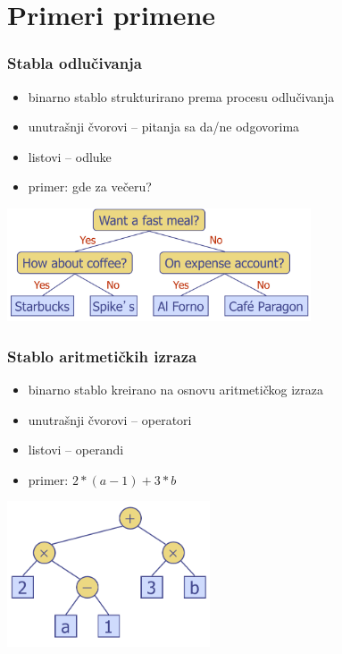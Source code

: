 \documentclass[compress,aspectratio=169]{beamer}
\begin{document}
\section[Primeri]{Primeri primene}
\begin{frame}[fragile]
  \frametitle{Stabla odlučivanja}
  \begin{itemize}
    \item binarno stablo strukturirano prema procesu odlučivanja
    \item unutrašnji čvorovi -- pitanja sa da/ne odgovorima
    \item listovi -- odluke
    \item primer: gde za večeru?
  \end{itemize}
  \begin{center}
    \includegraphics[width=9cm]{asp-08-pic16.png}
  \end{center}
\end{frame}

\begin{frame}[fragile]
  \frametitle{Stablo aritmetičkih izraza}
  \begin{itemize}
    \item binarno stablo kreirano na osnovu aritmetičkog izraza
    \item unutrašnji čvorovi -- operatori
    \item listovi -- operandi
    \item primer: $2 * (a - 1) + 3 * b$
  \end{itemize}
  \begin{center}
    \includegraphics[width=6cm]{asp-08-pic10.png}
  \end{center}
\end{frame}
\end{document}
